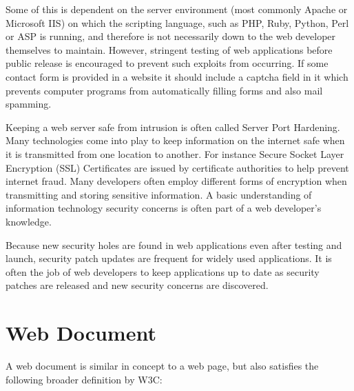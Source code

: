 Some of this is dependent on the server environment (most commonly Apache or Microsoft IIS) on which the scripting language, such as PHP, Ruby, Python, Perl or ASP is running, and therefore is not necessarily down to the web developer themselves to maintain. However, stringent testing of web applications before public release is encouraged to prevent such exploits from occurring. If some contact form is provided in a website it should include a captcha field in it which prevents computer programs from automatically filling forms and also mail spamming.

Keeping a web server safe from intrusion is often called Server Port Hardening. Many technologies come into play to keep information on the internet safe when it is transmitted from one location to another. For instance Secure Socket Layer Encryption (SSL) Certificates are issued by certificate authorities to help prevent internet fraud. Many developers often employ different forms of encryption when transmitting and storing sensitive information. A basic understanding of information technology security concerns is often part of a web developer's knowledge.

Because new security holes are found in web applications even after testing and launch, security patch updates are frequent for widely used applications. It is often the job of web developers to keep applications up to date as security patches are released and new security concerns are discovered.


\chapter{Web Document}

A web document\cite{web_document} is similar in concept to a web page, but also satisfies the following broader definition by W3C:



